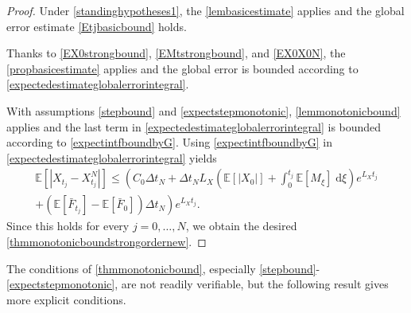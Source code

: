 \documentclass[reqno,12pt]{amsart}
\theoremstyle{plain}%
\theoremstyle{definition}
\begin{document}
\begin{proof}
    Under \cref{standinghypotheses1}, the \cref{lembasicestimate} applies and the global error estimate \eqref{Etjbasicbound} holds.
    
    Thanks to \eqref{EX0strongbound}, \eqref{EMtstrongbound}, and \eqref{EX0X0N}, the \cref{propbasicestimate} applies and the global error is bounded according to \eqref{expectedestimateglobalerrorintegral}.
    
    With assumptions \eqref{stepbound} and \eqref{expectstepmonotonic}, \cref{lemmonotonicbound} applies and the last term in \eqref{expectedestimateglobalerrorintegral} is bounded according to \eqref{expectintfboundbyG}. Using \eqref{expectintfboundbyG} in \eqref{expectedestimateglobalerrorintegral} yields
    \begin{multline*}
        \mathbb{E} \left[|X_{t_j} - X_{t_j}^N|\right] \leq \left( C_0 \Delta t_N + \Delta t_N L_X \left(\mathbb{E}[|X_0|] + \int_0^{t_j} \mathbb{E}[M_\xi]\;\mathrm{d}\xi\right)e^{L_X t_j}\right. \\
        \left. + (\mathbb{E}[\bar F_{t_j}] - \mathbb{E}[\bar F_0])\Delta t_N\right) e^{L_X t_j}.
    \end{multline*}
    Since this holds for every $j=0, \ldots, N$, we obtain the desired \eqref{thmmonotonicboundstrongordernew}.
\end{proof}

The conditions of \cref{thmmonotonicbound}, especially \eqref{stepbound}-\eqref{expectstepmonotonic}, are not readily verifiable, but the following result gives more explicit conditions.
\end{document}
